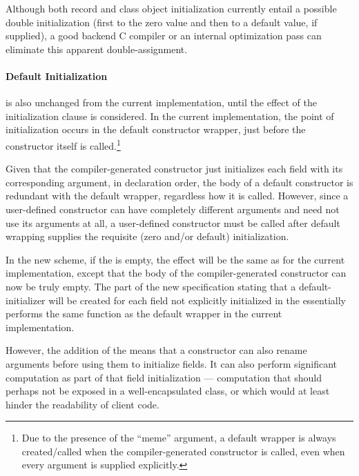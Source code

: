 Although both record and class object initialization currently entail a possible
double initialization (first to the zero value and then to a default value, if
supplied), a good backend C compiler or an internal optimization pass can
eliminate this apparent double-assignment.

\paragraph{Default Initialization} is also unchanged from the current
implementation, until the effect of the initialization clause is considered.  In
the current implementation, the point of initialization occurs in the default
constructor wrapper, just before the constructor itself is called.\footnote{Due
to the presence of the ``meme'' argument, a default wrapper is always
created/called when the compiler-generated constructor is called, even when
every argument is supplied explicitly.}  

Given that the compiler-generated
constructor just initializes each field with its corresponding argument, in
declaration order, the body of a default constructor is redundant with the
default wrapper, regardless how it is called.  However, since a user-defined
constructor can have completely different arguments and need not use its
arguments at all, a user-defined constructor must be called after default
wrapping supplies the requisite (zero and/or default) initialization.

In the new scheme, if the  is empty, the effect will
be the same as for the current implementation, except that the body of the
compiler-generated constructor can now be truly empty.  The part of the
new specification stating that a default-initializer will be created for each
field not explicitly initialized in the  essentially
performs the same function as the default wrapper in the current implementation.

However, the addition of the  means that a
constructor can also rename arguments before using them to initialize fields.
It can also perform significant computation as part of that field initialization
--- computation that should perhaps not be exposed in a well-encapsulated class,
or which would at least hinder the readability of client code.


